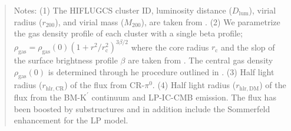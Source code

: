 \documentclass[10pt,aps,pra,reprint,amsmath,amsfonts,amssymb,showpacs,nofootinbib,floatfix]{revtex4-1}
\newcommand{\rmn}{\mathrm}
\newcommand{\Kp}{\rmn{K}^\prime}
\newcommand{\rvir}{r_{200}}
\newcommand{\mvir}{M_{200}}
\begin{document}
\begin{table}
\begin{minipage}{2.0\columnwidth}
\begin{quote}
  Notes: 
  (1) The HIFLUGCS cluster ID, luminosity distance
  ($D_\rmn{lum}$), virial radius ($\rvir$), and virial mass ($\mvir$),
  are taken from \cite{2002ApJ...567..716R}.
  (2) We parametrize the
  gas density profile of each cluster with a single beta profile;
  $\rho_\rmn{gas}=\rho_\rmn{gas}(0)(1+r^2/r_\rmn{c}^2)^{3\beta/2}$
  where the core radius $r_\rmn{c}$ and the slop of the surface
  brightness profile $\beta$ are taken from
  \cite{2002ApJ...567..716R}. The central gas density
  $\rho_\rmn{gas}(0)$ is determined through he procedure outlined in
  \cite{1999ApJ...517..627M}.
   (3) Half light radius ($r_\rmn{hlr,CR}$) of the flux from CR-$\pi^0$.
   (4) Half light radius ($r_\rmn{hlr,DM}$) of the flux from the BM-$\Kp$ 
  continuum and LP-IC-CMB emission. The flux has been
  boosted by substructures and in addition include the
  Sommerfeld enhancement for the LP model. 
 \label{tab:flux_tab_CLp}
  \end{quote}
\end{minipage}
\end{table} 
\end{document}
